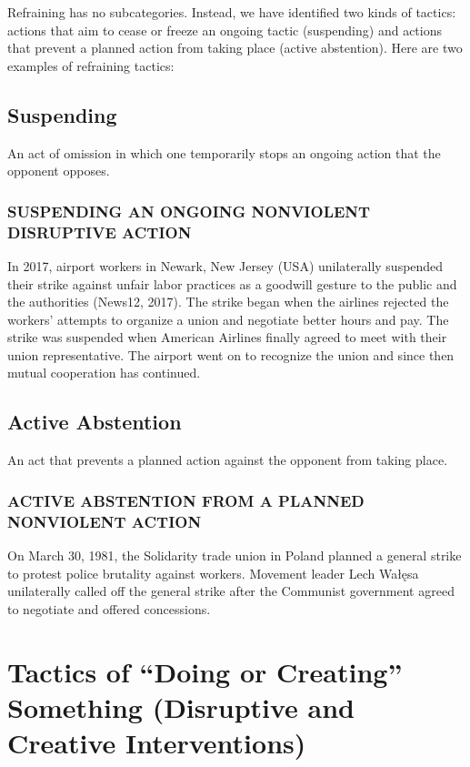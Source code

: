 \documentclass[twoside,a4paper,12pt,fleqn,openany]{extbook}
\begin{document}
Refraining has no subcategories. Instead, we have identified two kinds of tactics: actions that aim to cease or freeze an ongoing tactic (suspending) and actions that prevent a planned action from taking place (active abstention). Here are two examples of refraining tactics:

\subsection*{Suspending}

An act of omission in which one temporarily stops an ongoing action that the opponent opposes.

\subsubsection*{SUSPENDING AN ONGOING NONVIOLENT DISRUPTIVE ACTION}

In 2017, airport workers in Newark, New Jersey (USA) unilaterally suspended their strike against unfair labor practices as a goodwill gesture to the public and the authorities (News12, 2017). The strike began when the airlines rejected the workers’ attempts to organize a union and negotiate better hours and pay. The strike was suspended when American Airlines finally agreed to meet with their union representative. The airport went on to recognize the union and since then mutual cooperation has continued.

\subsection*{Active Abstention}

An act that prevents a planned action against the opponent from taking place.

\subsubsection*{ACTIVE ABSTENTION FROM A PLANNED NONVIOLENT ACTION}

On March 30, 1981, the Solidarity trade union in Poland planned a general strike to protest police brutality against workers. Movement leader Lech Wałęsa unilaterally called off the general strike after the Communist government agreed to negotiate and offered concessions.

\section*{Tactics of “Doing or Creating” Something (Disruptive and Creative Interventions)}
\end{document}

